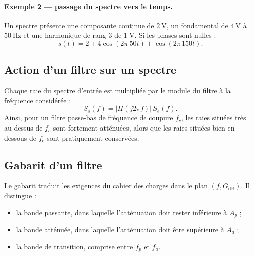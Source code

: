 \paragraph{Exemple 2 — passage du spectre vers le temps.}
Un spectre présente une composante continue de $\SI{2}{\volt}$, un fondamental de $\SI{4}{\volt}$ à $\SI{50}{\hertz}$ et une harmonique de rang 3 de $\SI{1}{\volt}$. Si les phases sont nulles :
\[
s(t)=2+4\cos(2\pi\,50t)+\cos(2\pi\,150t).
\]

\subsection{Action d'un filtre sur un spectre}\label{sec:elec-spectre-filtre}

Chaque raie du spectre d'entrée est multipliée par le module du filtre à la fréquence considérée :
\[
S_s(f)=|H(j2\pi f)|\,S_e(f).
\]
Ainsi, pour un filtre passe-bas de fréquence de coupure $f_c$, les raies situées très au-dessus de $f_c$ sont fortement atténuées, alors que les raies situées bien en dessous de $f_c$ sont pratiquement conservées.

\begin{center}
\end{center}

\subsection{Gabarit d'un filtre}\label{sec:elec-gabarit-filtre}

Le gabarit traduit les exigences du cahier des charges dans le plan $(f,G_{\mathrm{dB}})$. Il distingue :
\begin{itemize}
  \item la bande passante, dans laquelle l'atténuation doit rester inférieure à $A_p$ ;
  \item la bande atténuée, dans laquelle l'atténuation doit être supérieure à $A_a$ ;
  \item la bande de transition, comprise entre $f_p$ et $f_a$.
\end{itemize}

